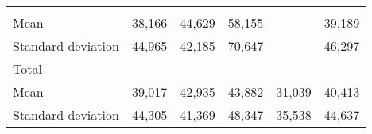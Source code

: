\begin{tabular}{llllll}
  \multicolumn{1}{r}{} &
  \multicolumn{1}{r}{} &
  \multicolumn{1}{r}{} &
  \multicolumn{1}{r}{} \\
\multicolumn{1}{l}{\hspace{4em}Mean} &
  \multicolumn{1}{|r}{38,166} &
  \multicolumn{1}{r}{44,629} &
  \multicolumn{1}{r}{58,155} &
  \multicolumn{1}{r}{} &
  \multicolumn{1}{r}{39,189} \\
\multicolumn{1}{l}{\hspace{4em}Standard deviation} &
  \multicolumn{1}{|r}{44,965} &
  \multicolumn{1}{r}{42,185} &
  \multicolumn{1}{r}{70,647} &
  \multicolumn{1}{r}{} &
  \multicolumn{1}{r}{46,297} \\
\multicolumn{1}{l}{\hspace{3em}Total} &
  \multicolumn{1}{|r}{} &
  \multicolumn{1}{r}{} &
  \multicolumn{1}{r}{} &
  \multicolumn{1}{r}{} &
  \multicolumn{1}{r}{} \\
\multicolumn{1}{l}{\hspace{4em}Mean} &
  \multicolumn{1}{|r}{39,017} &
  \multicolumn{1}{r}{42,935} &
  \multicolumn{1}{r}{43,882} &
  \multicolumn{1}{r}{31,039} &
  \multicolumn{1}{r}{40,413} \\
\multicolumn{1}{l}{\hspace{4em}Standard deviation} &
  \multicolumn{1}{|r}{44,305} &
  \multicolumn{1}{r}{41,369} &
  \multicolumn{1}{r}{48,347} &
  \multicolumn{1}{r}{35,538} &
  \multicolumn{1}{r}{44,637} \\
\cline{1-6}
\end{tabular}


